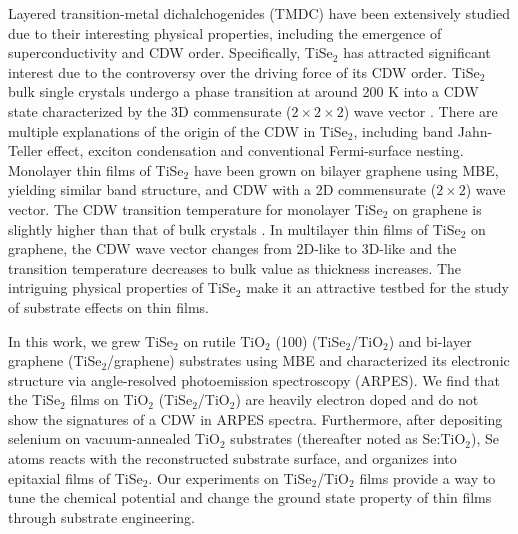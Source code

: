 \documentclass[journal=nalefd,manuscript=letter]{achemso}
\begin{document}
Layered transition-metal dichalchogenides (TMDC) have been extensively studied due to their interesting physical properties, including the emergence of superconductivity and CDW order\cite{Rossnagel11,Manzeli17}.
Specifically, TiSe$_2$ has attracted significant interest due to the controversy over the driving force of its CDW order.
TiSe$_2$ bulk single crystals undergo a phase transition at around 200 K into a CDW state characterized by the 3D commensurate ($2\times2\times2$) wave vector \cite{Salvo76}.
There are multiple explanations of the origin of the CDW in TiSe$_2$, including band Jahn-Teller effect\cite{Hughes77}, exciton condensation \cite{Wilson77SSC,Cercellier2007} and conventional Fermi-surface nesting\cite{Suzuki84SSC}.
Monolayer thin films of TiSe$_2$ have been grown on bilayer graphene using MBE, yielding similar band structure, and CDW with a 2D commensurate ($2\times2$) wave vector. The CDW transition temperature for monolayer TiSe$_2$ on graphene is slightly higher than that of bulk crystals \cite{ChenChiang15,SugawaraTakahashi16}.
In multilayer thin films of TiSe$_2$ on graphene, the CDW wave vector changes from 2D-like to 3D-like and the transition temperature decreases to bulk value as thickness increases\cite{ChenChiang16}.
The intriguing physical properties of TiSe$_2$ make it an attractive testbed for the study of substrate effects on thin films.

In this work, we grew TiSe$_2$ on rutile TiO$_2$ (100) (TiSe$_2$/TiO$_2$) and bi-layer graphene (TiSe$_2$/graphene) substrates using MBE and characterized its electronic structure via angle-resolved photoemission spectroscopy (ARPES).
We find that the TiSe$_2$ films on TiO$_2$ (TiSe$_2$/TiO$_2$) are heavily electron doped and do not show the signatures of a CDW in ARPES spectra.
Furthermore, after depositing selenium on vacuum-annealed TiO$_2$ substrates (thereafter noted as Se:TiO$_2$), Se atoms reacts with the reconstructed substrate surface, and organizes into epitaxial films of TiSe$_2$.
Our experiments on TiSe$_2$/TiO$_2$ films provide a way to tune the chemical potential and change the ground state property of thin films through substrate engineering.
\end{document}
